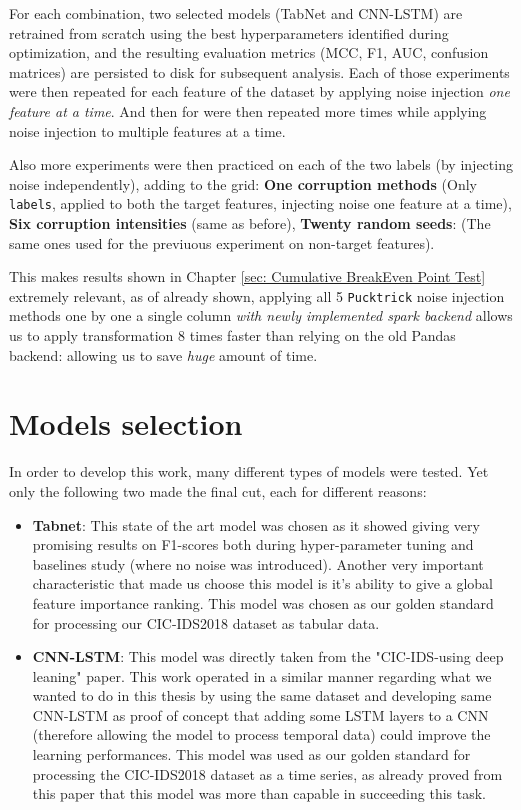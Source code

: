 \documentclass[../main.tex]{subfiles}
\begin{document}
For each combination, two selected models (TabNet and CNN-LSTM) are retrained from scratch using the best hyperparameters identified during optimization, and the resulting evaluation metrics (MCC, F1, AUC, confusion matrices) are persisted to disk for subsequent analysis. Each of those experiments were then repeated for each feature of the dataset by applying noise injection \emph{one feature at a time}. And then for  were then repeated  more times while applying noise injection to multiple features at a time. 

Also more experiments were then practiced on each of the two labels (by injecting noise independently), adding to the grid: \textbf{One corruption methods} (Only \texttt{labels}, applied to both the target features, injecting noise one feature at a time), \textbf{Six corruption intensities} (same as before), \textbf{Twenty random seeds}: (The same ones used for the previuous experiment on non-target features).

This makes results shown in Chapter \ref{sec: Cumulative BreakEven Point Test} extremely relevant, as of already shown, applying all 5 \texttt{Pucktrick} noise injection methods one by one a single column \emph{with newly implemented spark backend} allows us to apply transformation 8 times faster than relying on the old Pandas backend: allowing us to save \emph{huge} amount of time. 



\newpage
\section{Models selection}
\label{Chap: model selection}

In order to develop this work, many different types of models were tested. Yet only the following two made the final cut, each for different reasons:
\begin{itemize}
    \item \textbf{Tabnet}: This state of the art model was chosen as it showed giving very promising results on F1-scores both during hyper-parameter tuning and baselines study (where no noise was introduced). Another very important characteristic that made us choose this model is it's ability to give a global feature importance ranking. This model was chosen as our golden standard for processing our CIC-IDS2018 dataset as tabular data.
    \item \textbf{CNN-LSTM}: This model was directly taken from the "CIC-IDS-using deep leaning"\supercite{jablaoui2024effective} paper. This work operated in a similar manner regarding what we wanted to do in this thesis by using the same dataset and developing same CNN-LSTM as proof of concept that adding some LSTM layers to a CNN (therefore allowing the model to process temporal data) could improve the learning performances. This model was used as our golden standard for processing the CIC-IDS2018 dataset as a time series, as already proved from this paper that this model was more than capable in succeeding this task. 
\end{itemize}
\end{document}
